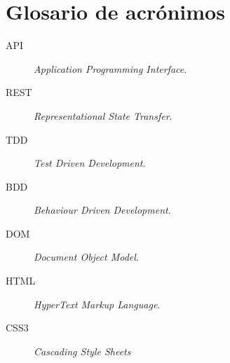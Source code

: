 \chapter{Glosario de acrónimos}
\label{chap:glosario-acronimos}


\begin{description}
 \item [API] \emph{Application Programming Interface}.
 \item [REST] \emph{Representational State Transfer}.
 \item [TDD] \emph{Test Driven Development}.
 \item [BDD] \emph{Behaviour Driven Development}.
 \item [DOM] \emph{Document Object Model}.
 \item [HTML] \emph{HyperText Markup Language}.
 \item [CSS3] \emph{Cascading Style Sheets}

\end{description}

